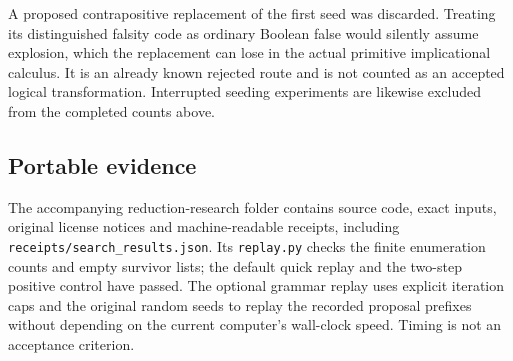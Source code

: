 A proposed contrapositive replacement of the first seed was discarded.
Treating its distinguished falsity code as ordinary Boolean false would
silently assume explosion, which the replacement can lose in the actual
primitive implicational calculus. It is an already known rejected route
and is not counted as an accepted logical transformation. Interrupted
seeding experiments are likewise excluded from the completed counts above.

\subsection{Portable evidence}

The accompanying reduction-research folder contains source code, exact
inputs, original license notices and machine-readable receipts, including
\texttt{receipts/search\_results.json}. Its \texttt{replay.py} checks the
finite enumeration counts and empty survivor lists; the default quick
replay and the two-step positive control have passed. The optional grammar
replay uses explicit iteration caps and the original random seeds to replay
the recorded proposal prefixes without depending on the current computer's
wall-clock speed. Timing is not an acceptance criterion.
